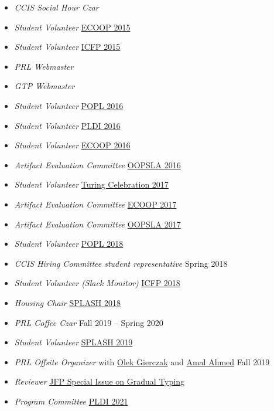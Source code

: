 \documentclass{article}
\begin{document}
\begin{itemize}
  \item \emph{CCIS Social Hour Czar} \hfill {}
  \item \emph{Student Volunteer} \hfill \href{http://2015.ecoop.org/}{ECOOP 2015}
  \item \emph{Student Volunteer} \hfill \href{http://icfpconference.org/icfp2015/}{ICFP 2015}
  \item \emph{PRL Webmaster} \hfill \href{https://github.com/nuprl/website}{}
  \item \emph{GTP Webmaster} \hfill \href{https://github.com/nuprl/gtp.github.io}{}
  \item \emph{Student Volunteer} \hfill \href{http://conf.researchr.org/home/POPL-2016}{POPL 2016}
  \item \emph{Student Volunteer} \hfill \href{http://conf.researchr.org/home/PLDI-2016}{PLDI 2016}
  \item \emph{Student Volunteer} \hfill \href{http://2016.ecoop.org/}{ECOOP 2016}
  \item \emph{Artifact Evaluation Committee} \hfill \href{http://2016.splashcon.org/track/splash-2016-artifacts}{OOPSLA 2016}
  \item \emph{Student Volunteer} \hfill \href{https://www.acm.org/turing-award-50/conference}{Turing Celebration 2017}
  \item \emph{Artifact Evaluation Committee} \hfill \href{https://2017.ecoop.org/track/ecoop-2017-Artifacts}{ECOOP 2017}
  \item \emph{Artifact Evaluation Committee} \hfill \href{https://2017.splashcon.org/track/splash-2017-OOPSLA-Artifacts}{OOPSLA 2017}
  \item \emph{Student Volunteer} \hfill \href{http://conf.researchr.org/home/POPL-2018}{POPL 2018}
  \item \emph{CCIS Hiring Committee student representative} \hfill {Spring 2018}
  \item \emph{Student Volunteer (Slack Monitor)} \hfill \href{https://icfp18.sigplan.org/committee/icfp-2018-organizing-committee}{ICFP 2018}
  \item \emph{Housing Chair} \hfill \href{https://2018.splashcon.org/committee/splash-2018-organizing-committee}{SPLASH 2018}
  \item \emph{PRL Coffee Czar} \hfill {Fall 2019 -- Spring 2020}
  \item \emph{Student Volunteer} \hfill \href{https://2019.splashcon.org/}{SPLASH 2019}
  \item \emph{PRL Offsite Organizer} with \href{https://www.khoury.northeastern.edu/people/olek-gierczak/}{Olek Gierczak} and \href{http://ccs.neu.edu/home/amal/}{Amal Ahmed} \hfill {Fall 2019}
  \item \emph{Reviewer} \hfill \href{https://www.cambridge.org/core/news/jfp-special-issue-on-gradual-typing}{JFP Special Issue on Gradual Typing}
  \item \emph{Program Committee} \hfill \href{https://pldi21.sigplan.org/committee/pldi-2021-papers-program-committee}{PLDI 2021}
\end{itemize}
\end{document}
